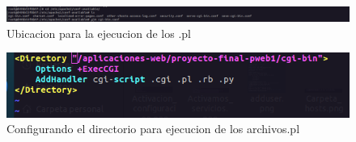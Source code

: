 \begin{figure}[H]
  \centering
  \includegraphics[width=1.0\textwidth]{img/Ubicacion_ejecucion.png}
  \caption{Ubicacion para la ejecucion de los .pl}
\end{figure}
\begin{figure}[H]
  \centering
  \includegraphics[width=1.0\textwidth]{img/Configurando.png}
  \caption{Configurando el directorio para ejecucion de los archivos.pl}
\end{figure}

